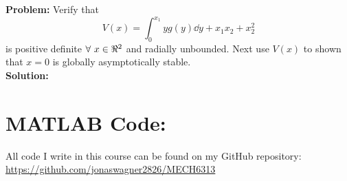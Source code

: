 \documentclass[letter]{article}
\begin{document}
\noindent
\textbf{Problem:}
Verify that
\begin{equation}
	V(x) = \int_0^{x_1} y g(y) \dd{y} + x_1 x_2 + x_2^2
\end{equation}
is positive  definite $\forall \ x \in \real^2$ and radially unbounded. Next use $V(x)$ to shown that $x=0$ is globally asymptotically stable.\\

\noindent
\textbf{Solution:}












\newpage
\appendix
\section{MATLAB Code:}\label{apx:matlab}
All code I write in this course can be found on my GitHub repository:\\
\href{https://github.com/jonaswagner2826/MECH6313}{https://github.com/jonaswagner2826/MECH6313}

\end{document}

